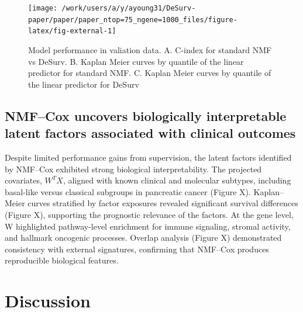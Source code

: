 \documentclass[9pt,twocolumn,twoside,]{pnas-new}
\begin{document}
\begin{figure}[t]

{\centering \texttt{[image: /work/users/a/y/ayoung31/DeSurv-paper/paper/paper\_ntop=75\_ngene=1000\_files/figure-latex/fig-external-1]} 

}

\caption{Model performance in valiation data. A. C-index for standard NMF vs DeSurv. B. Kaplan Meier curves by quantile of the linear predictor for standard NMF. C. Kaplan Meier curves by quantile of the linear predictor for DeSurv}\label{fig:fig-external}
\end{figure}

\subsection{NMF--Cox uncovers biologically interpretable latent factors
associated with clinical
outcomes}\label{nmfcox-uncovers-biologically-interpretable-latent-factors-associated-with-clinical-outcomes}

Despite limited performance gains from supervision, the latent factors
identified by NMF--Cox exhibited strong biological interpretability. The
projected covariates, \(W^TX\), aligned with known clinical and
molecular subtypes, including basal-like versus classical subgroups in
pancreatic cancer (Figure X). Kaplan--Meier curves stratified by factor
exposures revealed significant survival differences (Figure X),
supporting the prognostic relevance of the factors. At the gene level, W
highlighted pathway-level enrichment for immune signaling, stromal
activity, and hallmark oncogenic processes. Overlap analysis (Figure X)
demonstrated consistency with external signatures, confirming that
NMF--Cox produces reproducible biological features.

\section*{Discussion}\label{discussion}

\showmatmethods
\showacknow
\pnasbreak



% 
\end{document}
